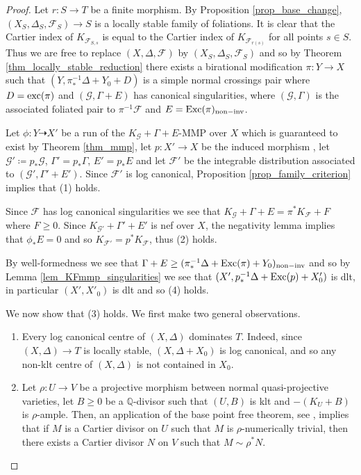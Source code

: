 \documentclass[12pt, a4paper]{amsart}
\newcounter{Theorem}
\theoremstyle{definition}
\theoremstyle{named}
\begin{document}
\begin{proof}
Let $r\colon S \rightarrow T$ be a finite morphism.
By Proposition \ref{prop_base_change}, 
$(X_S, \Delta_S, \mathcal F_S) \rightarrow S$ is a 
locally stable family of foliations.
It is clear that the Cartier index of $K_{\mathcal F_{S, s}}$ is equal to the Cartier index  of $K_{\mathcal F_{r(s)}}$ for all 
points $s \in S$.
Thus we are free to replace $(X, \Delta, \mathcal F)$
by $(X_S, \Delta_S, \mathcal F_S)$ and
so by Theorem \ref{thm_locally_stable_reduction}
there exists a  birational modification $\pi\colon Y \rightarrow X$ such that 
$(Y, \pi_*^{-1}\Delta+Y_0+D)$ is a simple normal crossings pair where $D = {\rm exc}(\pi)$ and 
$(\mathcal G, \Gamma+E)$ has canonical singularities, where
$(\mathcal G, \Gamma)$ is the associated foliated pair to $\pi^{-1}\mathcal F$
and $E = {\rm Exc}(\pi)_{{\rm non-inv}}$.


Let $\phi\colon Y \dashrightarrow X'$ be a run of the  $K_{\mathcal G}+\Gamma+E$-MMP over $X$ which is guaranteed to exist by Theorem \ref{thm_mmp}, let $p\colon X' \rightarrow X$ be the induced morphism , let $\mathcal G' \coloneqq p_*\mathcal G$,
$\Gamma' = p_*\Gamma$, $E' = p_*E$
and let $\mathcal F'$ be the integrable distribution associated to $(\mathcal G', \Gamma'+E')$.
Since $\mathcal F'$ is log canonical, Proposition \ref{prop_family_criterion} implies that (1) holds.


Since $\mathcal F$ has log canonical singularities we see that 
$K_{\mathcal G}+\Gamma+E = \pi^*K_{\mathcal F}+F$ where $F \ge 0$.
Since $K_{\mathcal G'}+\Gamma'+E'$ is nef over $X$, the negativity lemma implies that $\phi_*E = 0$ and so $K_{\mathcal F'} = p^*K_{\mathcal F}$, thus (2) holds.

By well-formedness we see that $\Gamma+E \ge (\pi_*^{-1}\Delta+{\rm Exc}(\pi)+Y_0)_{{\rm non-inv}}$ and so by Lemma \ref{lem_KFmmp_singularities} we see that  $(X', p_*^{-1}\Delta+{\rm Exc}(p)+X'_0)$ is dlt, 
in particular $(X', X'_0)$ is dlt 
and so (4) holds. 

We now show that (3) holds. 
We first make two general observations.
\begin{enumerate}
    \item \label{no_lc_places_central} Every log canonical centre of $(X, \Delta)$ 
dominates $T$.
Indeed, since $(X, \Delta) \to T$ is locally stable,  $(X, \Delta+X_0)$
is log canonical, and so any non-klt centre of $(X, \Delta)$ is not contained in 
$X_0$. 

\item \label{bpf_index_doesnt_change} Let $\rho\colon U \to V$ be a projective morphism between normal quasi-projective varieties, let $B \ge 0$
be a $\mathbb Q$-divisor such that $(U, B)$ is klt and $-(K_U+B)$ is $\rho$-ample.  Then, an application of the base point free theorem, see \cite[Theorem 3.7.(4)]{KM98}, implies that if $M$ is a Cartier divisor on $U$ such that $M$ is $\rho$-numerically trivial, then there exists a Cartier divisor $N$ on $V$ such that $M \sim \rho^*N$.
\end{enumerate}  





\end{proof}
\end{document}
